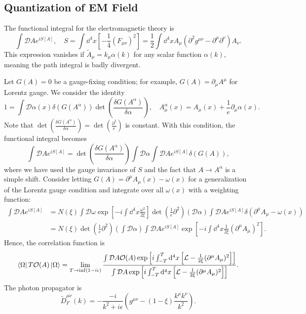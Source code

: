 \documentclass{article}
\begin{document}
\subsection{Quantization of EM Field}
The functional integral  for the electromagnetic theory is 
$$\int\mathcal DAe^{iS[A]},\quad S=\int\dd^4x\left[-\frac 14(F_{\mu\nu})^2\right]=\frac 12\int\dd^4xA_\mu(\partial^2g^{\mu\nu}-\partial^\mu\partial^\nu)A_\nu.$$
This expression vanishes if $\tilde A_\mu=k_\mu\alpha(k)$ for any scalar function $\alpha(k)$, meaning the path integral is badly divergent.

Let $G(A)=0$ be a gauge-fixing condition; for example, $G(A)=\partial_\mu A^\mu$ for Lorentz gauge. We consider the identity 
\begin{equation}
    1=\int\mathcal D\alpha(x)\delta(G(A^\alpha))\det\left(\frac{\delta G(A^\alpha)}{\delta\alpha}\right),\quad A^\alpha_\mu(x)=A_\mu(x)+\frac 1e\partial_\mu\alpha(x).
\end{equation}
Note that $\det\left(\frac{\delta G(A^\alpha)}{\delta\alpha}\right)=\det\left(\frac{\partial^2}e\right)$ is constant. With this condition, the functional integral becomes 
\begin{equation}
    \int\mathcal DAe^{iS[A]}=\det\left(\frac{\delta G(A^\alpha)}{\delta\alpha}\right)\int\mathcal D\alpha\int\mathcal DAe^{iS[A]}\delta(G(A)),
\end{equation}
where we have used the gauge invariance of $S$ and the fact that $A\to A^\alpha$ is a simple shift. Consider letting $G(A)=\partial^\mu A_\mu(x)-\omega(x)$ for a generalization of the Lorentz gauge condition and integrate over all $\omega(x)$ with a weighting function:
\begin{align*}
    \int\mathcal DAe^{iS[A]}&=N(\xi)\int\mathcal D\omega\exp\left[-i\int\dd^4x\frac{\omega^2}{2\xi}\right]\det\left(\frac 1e\partial^2\right)\left(\mathcal D\alpha\right)\int\mathcal DAe^{iS[A]}\delta(\partial^\mu A_\mu-\omega(x))\\
    &=N(\xi)\det\left(\frac 1e\partial^2\right)\left(\int\mathcal D\alpha\right)\int\mathcal DAe^{iS[A]}\exp\left[-i\int\dd^4x\frac 1{2\xi}(\partial^\mu A_\mu)^2\right].
\end{align*}
Hence, the correlation function is 
\begin{equation}
    \bra\Omega T\mathcal O(A)\ket\Omega=\lim_{T\to\inf(1-i\epsilon)}\frac{\int\mathcal DA\mathcal O(A)\exp\left[i\int^T_{-T}\dd^4x\left[\mathcal L-\frac 1{2\xi}(\partial^\mu A_\mu)^2\right]\right]}{\int\mathcal DA\exp\left[i\int^T_{-T}\dd^4x\left[\mathcal L-\frac 1{2\xi}(\partial^\mu A_\mu)^2\right]\right]}.
\end{equation}
The photon propagator is 
\begin{equation}
    \tilde D^{\mu\nu}_F(k)=-\frac{-i}{k^2+i\epsilon}\left(g^{\mu\nu}-(1-\xi)\frac{k^\mu k^\nu}{k^2}\right).
\end{equation}
\end{document}
